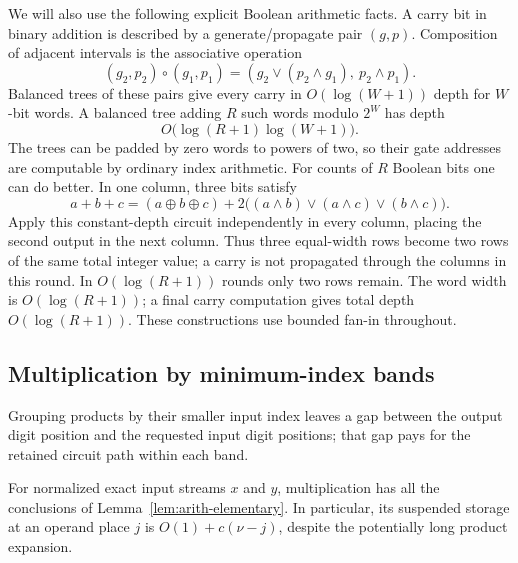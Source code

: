 We will also use the following explicit Boolean arithmetic facts.
A carry bit in binary addition is described by a generate/propagate
pair $(g,p)$.  Composition of adjacent intervals is the associative
operation
\[
 (g_2,p_2)\circ(g_1,p_1)
   =(g_2\lor(p_2\land g_1),\ p_2\land p_1).
\]
Balanced trees of these pairs give every carry in $O(\log(W+1))$
depth for $W$-bit words.  A balanced tree adding $R$ such words modulo
$2^W$ has depth
\begin{equation}
 O\bigl(\log(R+1)\log(W+1)\bigr).
 \label{eq:arith-adder-depth}
\end{equation}
The trees can be padded by zero words to powers of two, so their
gate addresses are computable by ordinary index arithmetic.
For counts of $R$ Boolean bits one can do better. In one column,
three bits satisfy
\[
 a+b+c=(a\mathbin\oplus b\mathbin\oplus c)
        +2\bigl((a\land b)\lor(a\land c)\lor(b\land c)\bigr).
\]
Apply this constant-depth circuit independently in every column,
placing the second output in the next column. Thus three equal-width
rows become two rows of the same total integer value; a carry is
not propagated through the columns in this round.  In $O(\log(R+1))$ rounds
only two rows remain.  The word width is $O(\log(R+1))$; a final
carry computation gives total depth $O(\log(R+1))$.  These
constructions use bounded fan-in throughout.

\subsection{Multiplication by minimum-index bands}

Grouping products by their smaller input index leaves a gap between
the output digit position and the requested input digit positions; that gap pays for
the retained circuit path within each band.

\begin{lemma}[Multiplication]
\label{lem:arith-multiplication}
For normalized exact input streams $x$ and $y$, multiplication has all
the conclusions of Lemma~\ref{lem:arith-elementary}.  In particular,
its suspended storage at an operand place $j$ is
$O(1)+c(\nu-j)$, despite the potentially long product expansion.
\end{lemma}

